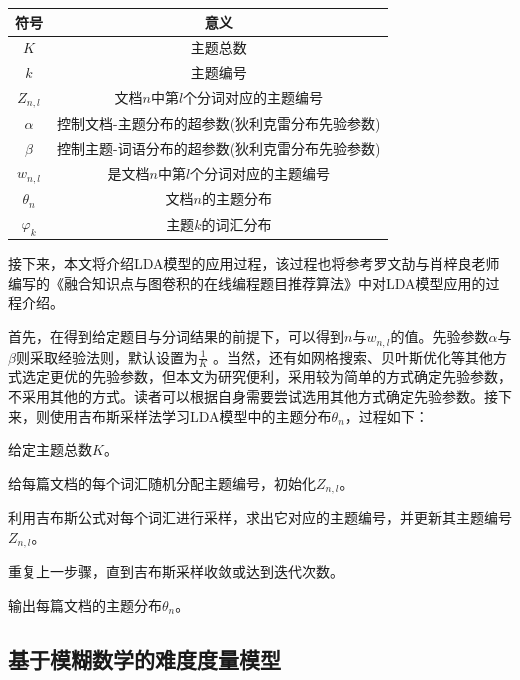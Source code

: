 \begin{table}[htbp]
    \centering
    \begin{tabular}{@{}cc@{}}
    \toprule
    符号            & 意义                        \\ \midrule
    $K$           & 主题总数                      \\
    $k$           & 主题编号                      \\
    $Z_{n,l}$     & 文档$n$中第$l$个分词对应的主题编号      \\
    $\alpha$      & 控制文档-主题分布的超参数(狄利克雷分布先验参数) \\
    $\beta$       & 控制主题-词语分布的超参数(狄利克雷分布先验参数) \\
    $w_{n,l}$     & 是文档$n$中第$l$个分词对应的主题编号     \\
    $\theta _{n}$ & 文档$n$的主题分布                \\
    $\varphi_{k}$ & 主题$k$的词汇分布                \\ \bottomrule
    \end{tabular}
\end{table}

接下来，本文将介绍LDA模型的应用过程，该过程也将参考罗文劼与肖梓良老师编写的《融合知识点与图卷积的在线编程题目推荐算法》\cite{LuoRongHeZhiShiDianYuTuJuanJiDeZaiXianBianChengTiMuTuiJianSuanFa}中对LDA模型应用的过程介绍。

首先，在得到给定题目与分词结果的前提下，可以得到$n$与$w_{n,l}$的值。先验参数$\alpha$与$\beta$则采取经验法则，默认设置为$\frac{1}{K}$ 。当然，还有如网格搜索、贝叶斯优化等其他方式选定更优的先验参数，但本文为研究便利，采用较为简单的方式确定先验参数，不采用其他的方式。读者可以根据自身需要尝试选用其他方式确定先验参数。接下来，则使用吉布斯采样法学习LDA模型中的主题分布$\theta _{n}$，过程如下：

\begin{mgAlgorithm}[吉布采样学习LDA模型过程]
    \item 给定主题总数$K$。
    \item 给每篇文档的每个词汇随机分配主题编号，初始化$Z_{n,l}$。
    \item 利用吉布斯公式对每个词汇进行采样，求出它对应的主题编号，并更新其主题编号$Z_{n,l}$。
    \item 重复上一步骤，直到吉布斯采样收敛或达到迭代次数。
    \item 输出每篇文档的主题分布$\theta _{n}$。
\end{mgAlgorithm}

\subsection{基于模糊数学的难度度量模型}

